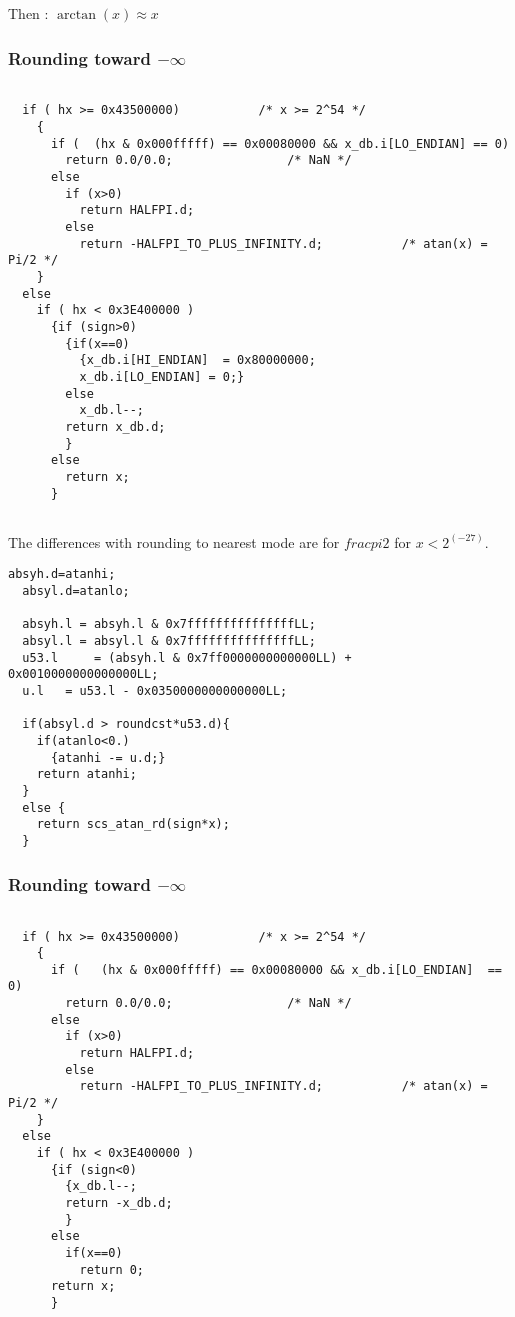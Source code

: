 Then : $\arctan(x) \approx x $
\bigskip

\subsubsection{Rounding toward $-\infty$}
\begin{lstlisting}[caption={Exceptional cases : rounding down},firstnumber=1]

  if ( hx >= 0x43500000)           /* x >= 2^54 */
    {
      if (  (hx & 0x000fffff) == 0x00080000 && x_db.i[LO_ENDIAN] == 0)
        return 0.0/0.0;                /* NaN */
      else
        if (x>0)
          return HALFPI.d;
        else
          return -HALFPI_TO_PLUS_INFINITY.d;           /* atan(x) = Pi/2 */
    }
  else
    if ( hx < 0x3E400000 )
      {if (sign>0)
        {if(x==0)
          {x_db.i[HI_ENDIAN]  = 0x80000000;
          x_db.i[LO_ENDIAN] = 0;}
        else
          x_db.l--;
        return x_db.d;
        }
      else
        return x;
      }
  
\end{lstlisting}

The differences with rounding to nearest mode are for $frac{pi}{2}$ for
$x<2^(-27)$.

\begin{lstlisting}[caption={Test for rounding down},firstnumber=1]
  absyh.d=atanhi;
  absyl.d=atanlo;
  
  absyh.l = absyh.l & 0x7fffffffffffffffLL;
  absyl.l = absyl.l & 0x7fffffffffffffffLL;
  u53.l     = (absyh.l & 0x7ff0000000000000LL) +  0x0010000000000000LL;
  u.l   = u53.l - 0x0350000000000000LL;
  
  if(absyl.d > roundcst*u53.d){
    if(atanlo<0.)
      {atanhi -= u.d;}
    return atanhi;
  }
  else {
    return scs_atan_rd(sign*x);
  }
\end{lstlisting}

\subsubsection{Rounding toward $-\infty$}

\begin{lstlisting}[caption={Exceptional cases : rounding up},firstnumber=1]

  if ( hx >= 0x43500000)           /* x >= 2^54 */
    {
      if (   (hx & 0x000fffff) == 0x00080000 && x_db.i[LO_ENDIAN]  == 0)
        return 0.0/0.0;                /* NaN */
      else
        if (x>0)
          return HALFPI.d;
        else
          return -HALFPI_TO_PLUS_INFINITY.d;           /* atan(x) = Pi/2 */
    }
  else
    if ( hx < 0x3E400000 )
      {if (sign<0)
        {x_db.l--;
        return -x_db.d;
        }
      else
        if(x==0)
          return 0;
      return x;
      }

\end{lstlisting}

